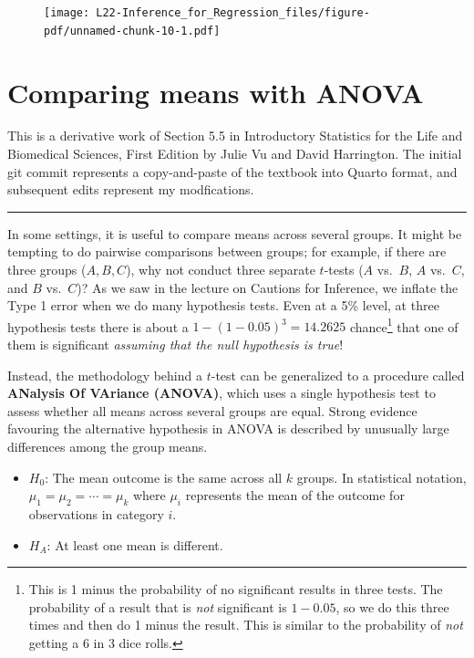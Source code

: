 \documentclass[
  letterpaper,
  DIV=11,
  numbers=noendperiod,
  oneside]{scrreprt}
\providecommand{\tightlist}{%
  \setlength{\itemsep}{0pt}\setlength{\parskip}{0pt}}\usepackage{longtable,booktabs,array}
\begin{document}
\begin{figure}[H]

{\centering \texttt{[image: L22-Inference\_for\_Regression\_files/figure-pdf/unnamed-chunk-10-1.pdf]}

}

\end{figure}

\hypertarget{comparing-means-with-anova}{%
\chapter{Comparing means with ANOVA}\label{comparing-means-with-anova}}

This is a derivative work of Section 5.5 in Introductory Statistics for
the Life and Biomedical Sciences, First Edition by Julie Vu and David
Harrington. The initial git commit represents a copy-and-paste of the
textbook into Quarto format, and subsequent edits represent my
modfications.

\begin{center}\rule{0.5\linewidth}{0.5pt}\end{center}

In some settings, it is useful to compare means across several groups.
It might be tempting to do pairwise comparisons between groups; for
example, if there are three groups (\(A, B, C\)), why not conduct three
separate \(t\)-tests (\(A\) vs.~\(B\), \(A\) vs.~\(C\), and \(B\)
vs.~\(C\))? As we saw in the lecture on Cautions for Inference, we
inflate the Type 1 error when we do many hypothesis tests. Even at a 5\%
level, at three hypothesis tests there is about a
\(1 - (1 - 0.05)^3 = 14.2625%
\) chance\footnote{This is 1 minus the probability of no significant
  results in three tests. The probability of a result that is \emph{not}
  significant is \(1-0.05\), so we do this three times and then do 1
  minus the result. This is similar to the probability of \emph{not}
  getting a 6 in 3 dice rolls.} that one of them is significant
\emph{assuming that the null hypothesis is true}!

Instead, the methodology behind a \(t\)-test can be generalized to a
procedure called \textbf{ANalysis Of VAriance (ANOVA)}, which uses a
single hypothesis test to assess whether all means across several groups
are equal. Strong evidence favouring the alternative hypothesis in ANOVA
is described by unusually large differences among the group means.

\begin{itemize}
\tightlist
\item
  \(H_0\): The mean outcome is the same across all \(k\) groups. In
  statistical notation, \(\mu_1 = \mu_2 = \cdots = \mu_k\) where
  \(\mu_i\) represents the mean of the outcome for observations in
  category \(i\).
\item
  \(H_A\): At least one mean is different.
\end{itemize}
\end{document}

